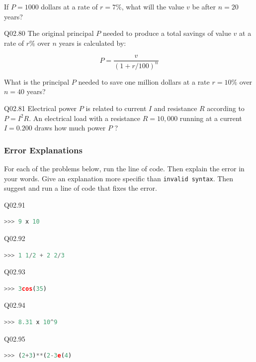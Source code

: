 \documentclass{book}
\newenvironment{problems}{}{}  %
\begin{document}
\begin{problems}
If \(P=1000\) dollars at a rate of \(r=7\%\), what will the value \(v\)
be after \(n=20\) years?

Q02.80 The original principal \(P\) needed to produce a total savings of
value \(v\) at a rate of \(r\%\) over \(n\) years is calculated by:

\[ P = \frac{v}{(1+r/100)^n} \]

What is the principal \(P\) needed to save one million dollars at a rate
\(r=10\%\) over \(n=40\) years?

Q02.81 Electrical power \(P\) is related to current \(I\) and resistance
\(R\) according to \(P = I^2R\). An electrical load with a resistance
\(R = 10,000\) running at a current \(I=0.200\) draws how much power
\(P\) ?
        \end{problems}

    




    
        \subsubsection{Error Explanations}\label{error-explanations}

For each of the problems below, run the line of code. Then explain the
error in your words. Give an explanation more specific than
\lstinline!invalid syntax!. Then suggest and run a line of code that
fixes the error.

Q02.91

\begin{lstlisting}[language=Python]
>>> 9 x 10
\end{lstlisting}

Q02.92

\begin{lstlisting}[language=Python]
>>> 1 1/2 + 2 2/3
\end{lstlisting}

Q02.93

\begin{lstlisting}[language=Python]
>>> 3cos(35)
\end{lstlisting}

Q02.94

\begin{lstlisting}[language=Python]
>>> 8.31 x 10^9
\end{lstlisting}

Q02.95

\begin{lstlisting}[language=Python]
>>> (2+3)**(2-3e(4)
\end{lstlisting}
\end{document}
